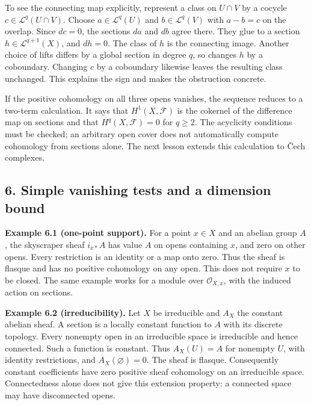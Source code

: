 \documentclass[11pt]{article}
\begin{document}
To see the connecting map explicitly, represent a class on \(U\cap V\)
by a cocycle \(c\in\mathcal L^q(U\cap V)\). Choose
\(a\in\mathcal L^q(U)\) and \(b\in\mathcal L^q(V)\) with \(a-b=c\) on
the overlap. Since \(dc=0\), the sections \(da\) and \(db\) agree there.
They glue to a section \(h\in\mathcal L^{q+1}(X)\), and \(dh=0\). The
class of \(h\) is the connecting image. Another choice of lifts differs
by a global section in degree \(q\), so changes \(h\) by a coboundary.
Changing \(c\) by a coboundary likewise leaves the resulting class
unchanged. This explains the sign and makes the obstruction concrete.

If the positive cohomology on all three opens vanishes, the sequence
reduces to a two-term calculation. It says that \(H^1(X,\mathcal F)\) is
the cokernel of the difference map on sections and that
\(H^q(X,\mathcal F)=0\) for \(q\geq2\). The acyclicity conditions must
be checked; an arbitrary open cover does not automatically compute
cohomology from sections alone. The next lesson extends this calculation
to Čech complexes.

\subsection{6. Simple vanishing tests and a dimension
bound}\label{simple-vanishing-tests-and-a-dimension-bound}

\textbf{Example 6.1 (one-point support).} For a point \(x\in X\) and an
abelian group \(A\), the skyscraper sheaf \(i_{x*}A\) has value \(A\) on
opens containing \(x\), and zero on other opens. Every restriction is an
identity or a map onto zero. Thus the sheaf is flasque and has no
positive cohomology on any open. This does not require \(x\) to be
closed. The same example works for a module over \(\mathcal O_{X,x}\),
with the induced action on sections.

\textbf{Example 6.2 (irreducibility).} Let \(X\) be irreducible and
\(A_X\) the constant abelian sheaf. A section is a locally constant
function to \(A\) with its discrete topology. Every nonempty open in an
irreducible space is irreducible and hence connected. Such a function is
constant. Thus \(A_X(U)=A\) for nonempty \(U\), with identity
restrictions, and \(A_X(\varnothing)=0\). The sheaf is flasque.
Consequently constant coefficients have zero positive sheaf cohomology
on an irreducible space. Connectedness alone does not give this
extension property: a connected space may have disconnected opens.
\end{document}
